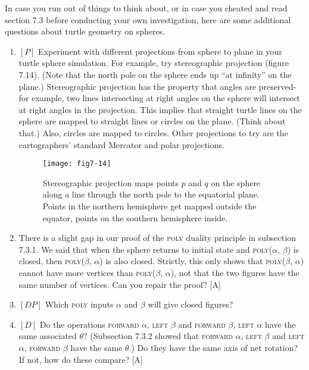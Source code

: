 \documentclass{book}
\begin{document}
In case you run out of things to think about, or in case you cheated and
read section 7.3 before conducting your own investigation, here are some
additional questions about turtle geometry on spheres.
\begin{enumerate}
\item $[P]$ Experiment with different projections from sphere to plane in
your turtle sphere simulation. For example, try stereographic projection
(figure 7.14). (Note that the north pole on the sphere ends up ``at
infinity'' on the plane.) Stereographic projection has the property that
angles are preserved-for example, two lines intersecting at right angles
on the sphere will intersect at right angles in the projection. This implies
that straight turtle lines on the sphere are mapped to straight lines or
circles on the plane. (Think about that.) Also, circles are mapped
to circles. Other projections to try are the cartographers' standard
Mercator and polar projections.

\begin{figure}
\begin{center}
\texttt{[image: fig7-14]}
\caption{Stereographic projection maps points $p$ and $q$ on the sphere along a line through the north pole to the equatorial plane. Points in the northern hemisphere get mapped outside the equator, points on the southern hemisphere inside.}
\end{center}
\end{figure}

\item There is a slight gap in our proof of the \textsc{poly} duality principle in
subsection 7.3.1. We said that when the sphere returns to initial state
and \textsc{poly}($\alpha$, $\beta$) is closed, then \textsc{poly}($\beta$, $\alpha$) is also closed. Strictly, this
only shows that \textsc{poly}($\beta$, $\alpha$) cannot have more vertices than \textsc{poly}($\beta$, $\alpha$),
not that the two figures have the same number of vertices. Can you
repair the proof? [A]

\item $[DP]$ Which \textsc{poly} inputs $\alpha$ and $\beta$ will give closed figures?

\item $[D]$ Do the operations \textsc{forward} $\alpha$, \textsc{left} $\beta$ and \textsc{forward} $\beta$, \textsc{left} $\alpha$ have the same associated $\theta$? (Subsection 7.3.2 showed that \textsc{forward} $\alpha$,
\textsc{left} $\beta$ and \textsc{left} $\alpha$, \textsc{forward} $\beta$ have the same $\theta$.) 
Do they have the same axis of net rotation? If not, how do these compare? [A]


\end{enumerate}
\end{document}
